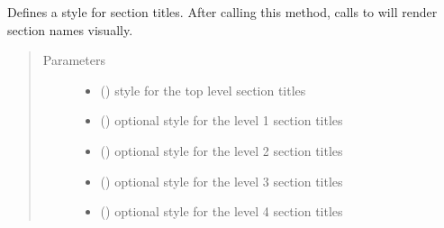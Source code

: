 \documentclass[letterpaper,10pt,english]{sphinxmanual}
\begin{document}
\begin{fulllineitems}
\begin{fulllineitems}
\label{\detokenize{generated/quality_assessment.quality_pdf_report.DefectReportPDF.set_section_title_styles:quality_assessment.quality_pdf_report.DefectReportPDF.set_section_title_styles}}
\sphinxAtStartPar
Defines a style for section titles.
After calling this method, calls to  will render section names visually.
\begin{quote}\begin{description}
\item[{Parameters}] \leavevmode\begin{itemize}
\item {} 
\sphinxAtStartPar
{} () \textendash{} style for the top level section titles

\item {} 
\sphinxAtStartPar
{} () \textendash{} optional style for the level 1 section titles

\item {} 
\sphinxAtStartPar
{} () \textendash{} optional style for the level 2 section titles

\item {} 
\sphinxAtStartPar
{} () \textendash{} optional style for the level 3 section titles

\item {} 
\sphinxAtStartPar
{} () \textendash{} optional style for the level 4 section titles


\end{itemize}
\end{description}
\end{quote}
\end{fulllineitems}
\end{fulllineitems}
\end{document}
